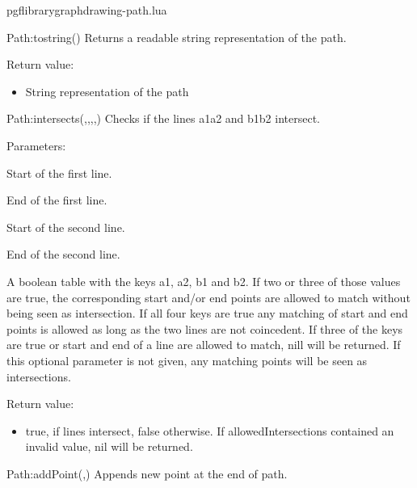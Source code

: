 
\begin{filedescription}{pgflibrarygraphdrawing-path.lua}


\begin{luacommand}{{Path:\textunderscore{}\textunderscore{}tostring}()}
Returns a readable string representation of the path.


Return value:
\begin{itemize} \item[] String representation of the path \end{itemize}


\end{luacommand}\begin{luacommand}{{Path:\textunderscore{}intersects}(,,,,)}
Checks if the lines a1a2 and b1b2 intersect.

Parameters:
\begin{parameterdescription}
	\item[\meta{a1}] Start of the first line.\item[\meta{a2}] End of the first line.\item[\meta{b1}] Start of the second line.\item[\meta{b2}] End of the second line.\item[\meta{allowedIntersections}] A boolean table with the keys a1, a2, b1 and b2. If two or three of those values are true, the corresponding start and/or end points are allowed to match without being seen as intersection. If all four keys are true any matching of start and end points is allowed as long as the two lines are not coincedent. If three of the keys are true or start and end of a line are allowed to match, nill will be returned. If this optional parameter is not given, any matching points will be seen as intersections.
\end{parameterdescription}


Return value:
\begin{itemize} \item[] true, if lines intersect, false otherwise. If allowedIntersections contained an invalid value, nil will be returned. \end{itemize}


\end{luacommand}\begin{luacommand}{{Path:addPoint}(,)}
Appends new point at the end of path.


\end{luacommand}
\end{filedescription}

